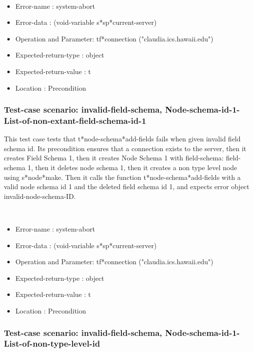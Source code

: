 \
\begin {itemize}
\item 	Error-name             : system-abort
\item Error-data             : (void-variable s*sp*current-server)
\item Operation and Parameter: tf*connection ("claudia.ics.hawaii.edu")
\item Expected-return-type   : object
\item Expected-return-value  : t
\item Location               : Precondition



\end {itemize}
\subsubsection {Test-case scenario: invalid-field-schema, Node-schema-id-1-List-of-non-extant-field-schema-id-1}


This test case tests that t*node-schema*add-fields fails when given invalid field schema id.
Its precondition ensures that a connection exists to the server, then it creates Field Schema 1, then it creates Node Schema 1 with field-schema: field-schema 1, then it deletes node schema 1, then it creates a non type level node using s*node*make.
Then it calls the function t*node-schema*add-fields  with a valid node schema id 1 and the deleted field schema id 1, and expects error object invalid-node-schema-ID.



\
\begin {itemize}
\item 	Error-name             : system-abort
\item Error-data             : (void-variable s*sp*current-server)
\item Operation and Parameter: tf*connection ("claudia.ics.hawaii.edu")
\item Expected-return-type   : object
\item Expected-return-value  : t
\item Location               : Precondition



\end {itemize}
\subsubsection {Test-case scenario: invalid-field-schema, Node-schema-id-1-List-of-non-type-level-id}


